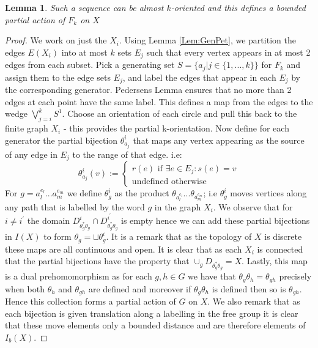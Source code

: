 \documentclass[11pt]{amsart}
\theoremstyle{plain}
\newtheorem{lemma}[theorem]{Lemma}%
\theoremstyle{definition}%
\theoremstyle{remark}%
\begin{document}
\begin{lemma}\label{Lem:SFGL1}
Such a sequence can be almost $k$-oriented and this defines a bounded partial action of $F_{k}$ on $X$
\end{lemma}
\begin{proof}
We work on just the $X_{i}$. Using Lemma \ref{Lem:GenPet}, we partition the edges $E(X_{i})$ into at most $k$ sets $E_{j}$ such that every vertex appears in at most 2 edges from each subset. Pick a generating set $S=\lbrace a_{j} | j\in \lbrace 1,...,k\rbrace\rbrace$ for $F_{k}$ and assign them to the edge sets $E_{j}$, and label the edges that appear in each $E_{j}$ by the corresponding generator. Pedersens Lemma ensures that no more than 2 edges at each point have the same label. This defines a map from the edges to the wedge $\bigvee_{j=i}^{k}S^{1}$. Choose an orientation of each circle and pull this back to the finite graph $X_{i}$ - this provides the partial k-orientation. Now define for each generator the partial bijection $\theta^{i}_{a_{j}}$ that maps any vertex appearing as the source of any edge in $E_{j}$ to the range of that edge. i.e:
\begin{equation*}
\theta^{i}_{a_{j}}(v) := \left\{ \begin{array}{c} r(e) \mbox{ if } \exists e \in E_{j}: s(e)=v \\ \mbox{undefined otherwise} \end{array}\right.
\end{equation*}
For $g=a_{l}^{e_{l}}...a_{m}^{e_{m}}$ we define $\theta^{i}_{g}$ as the product $\theta_{a_{l}^{e_{l}}}...\theta_{a_{m}^{e_{m}}}$; i.e $\theta_{g}^{i}$ moves vertices along any path that is labelled by the word $g$ in the graph $X_{i}$. We observe that for $i \not = i^{'}$ the domain $D_{\theta_{g}^{*}\theta_{g}}^{i}\cap D_{\theta_{g}^{*}\theta_{g}}^{i^{'}}$ is empty hence we can add these partial bijections in $I(X)$ to form $\theta_{g}=\sqcup\theta_{g}^{i}$. It is a remark that as the topology of $X$ is discrete these maps are all continuous and open. It is clear that as each $X_{i}$ is connected that the partial bijections have the property that $\cup_{g} D_{\theta_{g}^{*}\theta_{g}} = X$. Lastly, this map is a dual prehomomorphism as for each $g,h \in G$ we have that $\theta_{g}\theta_{h}=\theta_{gh}$ precisely when both $\theta_{h}$ and $\theta_{gh}$ are defined and moreover if $\theta_{g}\theta_{h}$ is defined then so is $\theta_{gh}$. Hence this collection forms a partial action of $G$ on $X$. We also remark that as each bijection is given translation along a labelling in the free group it is clear that these move elements only a bounded distance and are therefore elements of $I_{b}(X)$.
\end{proof}
\end{document}
